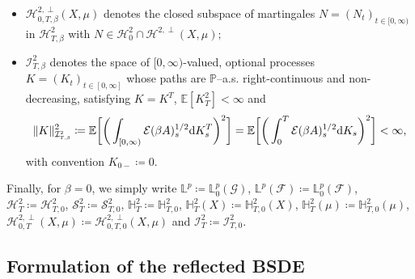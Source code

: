 \documentclass[10pt]{article} %
\newcommand\cE{\mathcal E}
\newcommand\cF{\mathcal F}
\newcommand\cG{\mathcal G}
\newcommand\cH{\mathcal H}
\newcommand\cI{\mathcal I}
\newcommand\cS{\mathcal S}
\newcommand{\smalltext}[1]{\text{\fontsize{4}{4}\selectfont$#1$}}
\def \E{\mathbb{E}}
\def \H{\mathbb{H}}
\def \L{\mathbb{L}}
\def \P{\mathbb{P}}
\def\d{\mathrm{d}}
\begin{document}
\begin{itemize}[leftmargin=0.9cm]
		\begin{equation*}
			\|U\|^2_{\H^\smalltext{2}_{\smalltext{T}\smalltext{,}\smalltext{\beta}}(\mu)} \coloneqq \big\|\cE(\beta A)^{1/2}U\mathbf{1}_{\llbracket 0, T \rrbracket}\big\|^2_{\H^\smalltext{2}(\mu)} = \E\bigg[\int_0^T \cE(\beta A)_s \d \langle U \star \tilde\mu \rangle_s\bigg] < \infty;
		\end{equation*}
	\item $\cH^{2,\perp}_{0,T,\beta}(X,\mu)$ denotes the closed subspace of martingales $N = (N_t)_{t \in [0,\infty)}$ in $\cH^2_{T,\beta}$ with $N \in \cH^2_0 \cap \cH^{2,\perp}(X,\mu);$
	\item $\cI^2_{T,\beta}$ denotes the space of $[0,\infty)$-valued, optional processes $K = (K_t)_{t \in [0,\infty]}$ whose paths are $\P$--a.s. right-continuous and non-decreasing, satisfying $K = K^T$, $\E[K^2_T] < \infty$ and
	\begin{equation*}
		\|K\|^2_{\cI^\smalltext{2}_{\smalltext{T}\smalltext{,}\smalltext{\beta}}} \coloneqq \E\bigg[\bigg(\int_{[0,\infty)}\cE(\beta A)^{1/2}_s \d K^T_s\bigg)^2\bigg] = \E\bigg[\bigg(\int_0^T\cE(\beta A)^{1/2}_s \d K_s\bigg)^2\bigg] < \infty,
	\end{equation*}
	with convention $K_{0-} \coloneqq 0$.
	\end{itemize}
Finally, for $\beta = 0$, we simply write $\L^p \coloneqq \L^p_0(\cG)$, $\L^p(\cF) \coloneqq \L^p_0(\cF)$, $\cH^2_T \coloneqq \cH^2_{T,0}$, $\cS^2_T \coloneqq \cS^2_{T,0}$, $\H^2_T \coloneqq \H^2_{T,0}$, $\H^2_T(X) \coloneqq \H^2_{T,0}(X)$, $\H^2_T(\mu) \coloneqq \H^2_{T,0}(\mu)$, $\cH^{2,\perp}_{0,T}(X,\mu) \coloneqq \cH^{2,\perp}_{0,T,0}(X,\mu)$ and $\cI^2_{T} \coloneqq \cI^2_{T,0}$.


\subsection{Formulation of the reflected BSDE}\label{sec::formulation}
\end{document}
